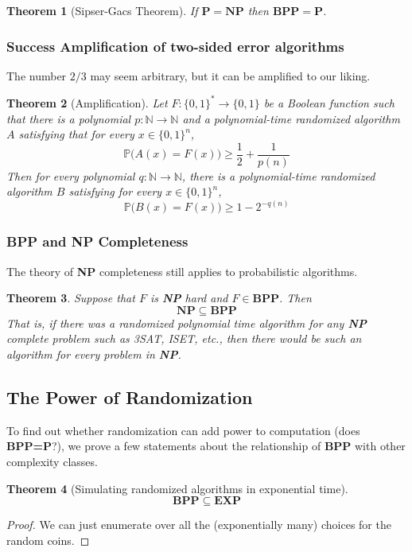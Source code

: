\documentclass[a4paper, 12pt]{report}
\newtheorem{theorem}{Theorem}[section]
\theoremstyle{remark}
\theoremstyle{definition}
\begin{document}
\begin{theorem}[Sipser-Gacs Theorem]
If $\mathbf{P = NP}$ then $\mathbf{BPP = P}$. 
\end{theorem}

\subsubsection{Success Amplification of two-sided error algorithms}
The number $2/3$ may seem arbitrary, but it can be amplified to our liking.

\begin{theorem}[Amplification]
Let $F: \{0, 1\}^* \longrightarrow \{0, 1\}$ be a Boolean function such that there is a polynomial $p: \mathbb{N} \longrightarrow \mathbb{N}$ and a polynomial-time randomized algorithm $A$ satisfying that for every $x \in \{0, 1\}^n$, 
\[\mathbb{P} \big( A(x) = F(x) \big) \geq \frac{1}{2} + \frac{1}{p(n)}\]
Then for every polynomial $q: \mathbb{N} \longrightarrow \mathbb{N}$, there is a polynomial-time randomized algorithm $B$ satisfying for every $x \in \{0, 1\}^n$,
\[\mathbb{P} \big( B(x) = F(x)\big) \geq 1 - 2^{-q(n)}\]
\end{theorem}

\subsubsection{BPP and NP Completeness}
The theory of \textbf{NP} completeness still applies to probabilistic algorithms. 

\begin{theorem}
Suppose that $F$ is \textbf{NP} hard and $F \in \mathbf{BPP}$. Then 
\[\mathbf{NP \subseteq BPP}\]
That is, if there was a randomized polynomial time algorithm for any \textbf{NP} complete problem such as 3SAT, ISET, etc., then there would be such an algorithm for \textit{every} problem in \textbf{NP}. 
\end{theorem}

\subsection{The Power of Randomization}
To find out whether randomization can add power to computation (does \textbf{BPP=P}?), we prove a few statements about the relationship of \textbf{BPP} with other complexity classes. 

\begin{theorem}[Simulating randomized algorithms in exponential time]
\[\mathbf{BPP \subseteq EXP}\]
\end{theorem}
\begin{proof}
We can just enumerate over all the (exponentially many) choices for the random coins. 
\end{proof}
\end{document}

